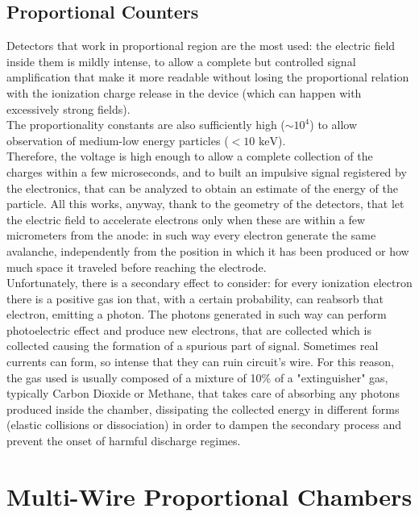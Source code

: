 \documentclass[a4paper,11pt]{book}
\begin{document}
\subsection{Proportional Counters}
Detectors that work in proportional region are the most used: the electric field inside them is mildly intense, to allow a complete but controlled signal amplification that make it more readable without losing the proportional relation with the ionization charge release in the device (which can happen with excessively strong fields).\\
The proportionality constants are also sufficiently high ($\sim 10^4$) to allow observation of medium-low energy particles ($<10\text{ keV}$).\\
Therefore, the voltage is high enough to allow a complete collection of the charges within a few microseconds, and to built an impulsive signal registered by the electronics, that can be analyzed to obtain an estimate of the energy of the particle. All this works, anyway, thank to the geometry of the detectors, that let the electric field to accelerate electrons only when these are within a few micrometers from the anode: in such way every electron generate the same avalanche, independently from the position in which it has been produced or how much space it traveled before reaching the electrode.\\
Unfortunately, there is a secondary effect to consider: for every ionization electron there is a positive gas ion that, with a certain probability, can reabsorb that electron, emitting a photon. The photons generated in such way can perform photoelectric effect and produce new electrons, that are collected which is collected causing the formation of a spurious part of signal. Sometimes real currents can form, so intense that they can ruin circuit's wire. For this reason, the gas used is usually composed of a mixture of 10\% of a "extinguisher" gas, typically Carbon Dioxide or Methane, that takes care of absorbing any photons produced inside the chamber, dissipating the collected energy in different forms (elastic collisions or dissociation) in order to dampen the secondary process and prevent the onset of harmful discharge regimes.\\



\section{Multi-Wire Proportional Chambers}
\end{document}
